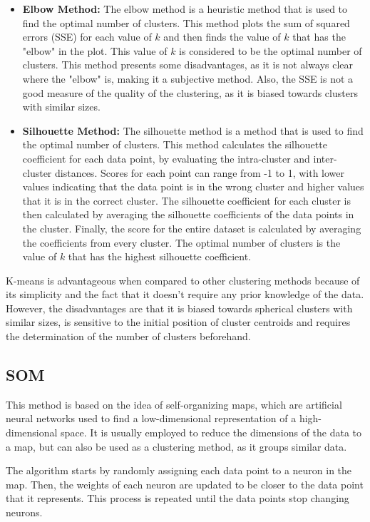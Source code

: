 \begin{itemize}
    \item \textbf{Elbow Method:} The elbow method is a heuristic method that is used to find the optimal number of clusters. This method plots the sum of squared errors (SSE) for each value of $k$ and then finds the value of $k$ that has the "elbow" in the plot. This value of $k$ is considered to be the optimal number of clusters. This method presents some disadvantages, as it is not always clear where the "elbow" is, making it a subjective method. Also, the SSE is not a good measure of the quality of the clustering, as it is biased towards clusters with similar sizes.
    \item \textbf{Silhouette Method:} The silhouette method is a method that is used to find the optimal number of clusters. This method calculates the silhouette coefficient for each data point, by evaluating the intra-cluster and inter-cluster distances. Scores for each point can range from -1 to 1, with lower values indicating that the data point is in the wrong cluster and higher values that it is in the correct cluster. The silhouette coefficient for each cluster is then calculated by averaging the silhouette coefficients of the data points in the cluster. Finally, the score for the entire dataset is calculated by averaging the coefficients from every cluster. The optimal number of clusters is the value of $k$ that has the highest silhouette coefficient.
\end{itemize}

K-means is advantageous when compared to other clustering methods because of its simplicity and the fact that it doesn't require any prior knowledge of the data. However, the disadvantages are that it is biased towards spherical clusters with similar sizes, is sensitive to the initial position of cluster centroids and requires the determination of the number of clusters beforehand.

\subsection{SOM}\label{sec:som}
This method is based on the idea of self-organizing maps, which are artificial neural networks used to find a low-dimensional representation of a high-dimensional space. It is usually employed to reduce the dimensions of the data to a map, but can also be used as a clustering method, as it groups similar data. 

The algorithm starts by randomly assigning each data point to a neuron in the map. Then, the weights of each neuron are updated to be closer to the data point that it represents. This process is repeated until the data points stop changing neurons. 

